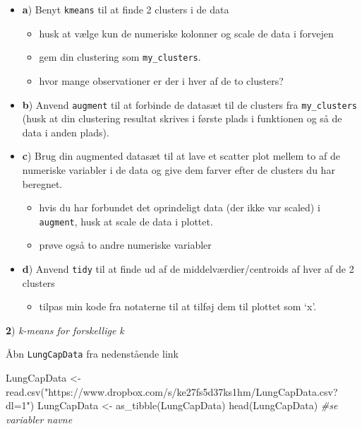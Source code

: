 \documentclass[
]{book}
\newenvironment{Shaded}{\begin{snugshade}}{\end{snugshade}}
\newcommand{\CommentTok}[1]{\textcolor[rgb]{0.56,0.35,0.01}{\textit{#1}}}
\newcommand{\FunctionTok}[1]{\textcolor[rgb]{0.00,0.00,0.00}{#1}}
\newcommand{\NormalTok}[1]{#1}
\newcommand{\OtherTok}[1]{\textcolor[rgb]{0.56,0.35,0.01}{#1}}
\newcommand{\StringTok}[1]{\textcolor[rgb]{0.31,0.60,0.02}{#1}}
\providecommand{\tightlist}{%
  \setlength{\itemsep}{0pt}\setlength{\parskip}{0pt}}
\begin{document}
\begin{itemize}
\item
  \textbf{a}) Benyt \texttt{kmeans} til at finde 2 clusters i de data

  \begin{itemize}
  \tightlist
  \item
    husk at vælge kun de numeriske kolonner og scale de data i forvejen
  \item
    gem din clustering som \texttt{my\_clusters}.
  \item
    hvor mange observationer er der i hver af de to clusters?
  \end{itemize}
\item
  \textbf{b}) Anvend \texttt{augment} til at forbinde de datasæt til de clusters fra \texttt{my\_clusters} (husk at din clustering resultat skrives i første plads i funktionen og så de data i anden plads).
\item
  \textbf{c}) Brug din augmented datasæt til at lave et scatter plot mellem to af de numeriske variabler i de data og give dem farver efter de clusters du har beregnet.

  \begin{itemize}
  \tightlist
  \item
    hvis du har forbundet det oprindeligt data (der ikke var scaled) i \texttt{augment}, husk at scale de data i plottet.
  \item
    prøve også to andre numeriske variabler
  \end{itemize}
\item
  \textbf{d}) Anvend \texttt{tidy} til at finde ud af de middelværdier/centroids af hver af de 2 clusters

  \begin{itemize}
  \tightlist
  \item
    tilpas min kode fra notaterne til at tilføj dem til plottet som `x'.
  \end{itemize}
\end{itemize}

\textbf{2}) \emph{k-means for forskellige k}

Åbn \texttt{LungCapData} fra nedenstående link

\begin{Shaded}
\begin{Highlighting}[]
\NormalTok{LungCapData }\OtherTok{\textless{}{-}} \FunctionTok{read.csv}\NormalTok{(}\StringTok{"https://www.dropbox.com/s/ke27fs5d37ks1hm/LungCapData.csv?dl=1"}\NormalTok{)}
\NormalTok{LungCapData }\OtherTok{\textless{}{-}} \FunctionTok{as\_tibble}\NormalTok{(LungCapData)}
\FunctionTok{head}\NormalTok{(LungCapData) }\CommentTok{\#se variabler navne}
\end{Highlighting}
\end{Shaded}
\end{document}
